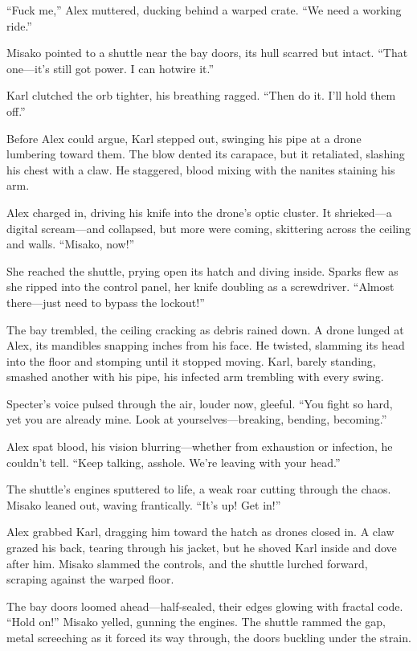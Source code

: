 \documentclass[12pt]{book}
\begin{document}
\enquote{Fuck me,} Alex muttered, ducking behind a warped crate. \enquote{We need a working ride.}

Misako pointed to a shuttle near the bay doors, its hull scarred but intact. \enquote{That one---it’s still got power. I can hotwire it.}

Karl clutched the orb tighter, his breathing ragged. \enquote{Then do it. I’ll hold them off.}

Before Alex could argue, Karl stepped out, swinging his pipe at a drone lumbering toward them. The blow dented its carapace, but it retaliated, slashing his chest with a claw. He staggered, blood mixing with the nanites staining his arm.

Alex charged in, driving his knife into the drone’s optic cluster. It shrieked---a digital scream---and collapsed, but more were coming, skittering across the ceiling and walls. \enquote{Misako, now!}

She reached the shuttle, prying open its hatch and diving inside. Sparks flew as she ripped into the control panel, her knife doubling as a screwdriver. \enquote{Almost there---just need to bypass the lockout!}

The bay trembled, the ceiling cracking as debris rained down. A drone lunged at Alex, its mandibles snapping inches from his face. He twisted, slamming its head into the floor and stomping until it stopped moving. Karl, barely standing, smashed another with his pipe, his infected arm trembling with every swing.

Specter’s voice pulsed through the air, louder now, gleeful. \enquote{You fight so hard, yet you are already mine. Look at yourselves---breaking, bending, becoming.}

Alex spat blood, his vision blurring---whether from exhaustion or infection, he couldn’t tell. \enquote{Keep talking, asshole. We’re leaving with your head.}

The shuttle’s engines sputtered to life, a weak roar cutting through the chaos. Misako leaned out, waving frantically. \enquote{It’s up! Get in!}

Alex grabbed Karl, dragging him toward the hatch as drones closed in. A claw grazed his back, tearing through his jacket, but he shoved Karl inside and dove after him. Misako slammed the controls, and the shuttle lurched forward, scraping against the warped floor.

The bay doors loomed ahead---half-sealed, their edges glowing with fractal code. \enquote{Hold on!} Misako yelled, gunning the engines. The shuttle rammed the gap, metal screeching as it forced its way through, the doors buckling under the strain.
\end{document}

